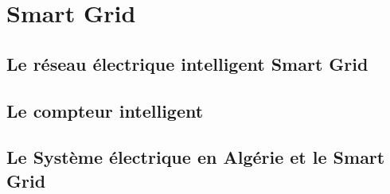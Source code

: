 \chapter{Smart Grid}
    
    \newpage
    \section{Le réseau électrique intelligent Smart Grid}
    	
    	\newpage
    	
    	\newpage
    	
    	\newpage
    	
    	
    	
    	\newpage
    	
    	\newpage
    	
    	\newpage
    	
    \section{Le compteur intelligent}
    	
    	\newpage
    	
    	\newpage
    	
    	\newpage
    	
	\section{Le Système électrique en Algérie et le Smart Grid}
		
    	\newpage
    	
    	\newpage
    	




